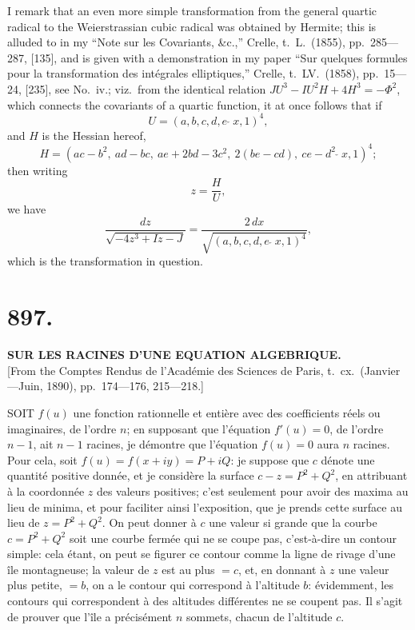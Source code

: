 \documentclass[11pt,a4paper]{book}
\begin{document}
I remark that an even more simple transformation from the general quartic radical to the Weierstrassian cubic radical was obtained by Hermite; this is alluded to in my ``Note sur les Covariants, \&c.,'' Crelle, t.\ L.\ (1855), pp.\ 285---287, [135], and is given with a demonstration in my paper ``Sur quelques formules pour la transformation des int\'egrales elliptiques,'' Crelle, t.\ LV.\ (1858), pp.\ 15---24, [235], see No.\ iv.; viz.\ from the identical relation $JU^3 - IU^2H + 4H^3 = -\Phi^2$, which connects the covariants of a quartic function, it at once follows that if
\[
U = (a, b, c, d, e \,\check{\,}\, x, 1)^4,
\]
and $H$ is the Hessian hereof,
\[
H = (ac-b^2,\ ad-bc,\ ae+2bd-3c^2,\ 2(be-cd),\ ce-d^2 \,\check{\,}\, x, 1)^4;
\]
then writing
\[
z = \frac{H}{U},
\]
we have
\[
\frac{dz}{\sqrt{-4z^3 + Iz - J}} = \frac{2\,dx}{\sqrt{(a, b, c, d, e \,\check{\,}\, x, 1)^4}},
\]
which is the transformation in question.


\section*{897.}
\begin{center}
{\large\bfseries SUR LES RACINES D'UNE EQUATION ALGEBRIQUE.}\\[0.5em]
\small [From the Comptes Rendus de l'Acad\'emie des Sciences de Paris, t.\ cx.\ (Janvier---Juin, 1890), pp.\ 174---176, 215---218.]
\end{center}

SOIT $f(u)$ une fonction rationnelle et enti\`ere avec des coefficients r\'eels ou imaginaires, de l'ordre $n$; en supposant que l'\'equation $f'(u) = 0$, de l'ordre $n - 1$, ait $n - 1$ racines, je d\'emontre que l'\'equation $f(u) = 0$ aura $n$ racines. Pour cela, soit $f(u) = f(x + iy) = P + iQ$: je suppose que $c$ d\'enote une quantit\'e positive donn\'ee, et je consid\`ere la surface $c - z = P^2 + Q^2$, en attribuant \`a la coordonn\'ee $z$ des valeurs positives; c'est seulement pour avoir des maxima au lieu de minima, et pour faciliter ainsi l'exposition, que je prends cette surface au lieu de $z = P^2 + Q^2$. On peut donner \`a $c$ une valeur si grande que la courbe $c = P^2 + Q^2$ soit une courbe ferm\'ee qui ne se coupe pas, c'est-\`a-dire un contour simple: cela \'etant, on peut se figurer ce contour comme la ligne de rivage d'une \^ile montagneuse; la valeur de $z$ est au plus $= c$, et, en donnant \`a $z$ une valeur plus petite, $= b$, on a le contour qui correspond \`a l'altitude $b$: \'evidemment, les contours qui correspondent \`a des altitudes diff\'erentes ne se coupent pas. Il s'agit de prouver que l'\^ile a pr\'ecis\'ement $n$ sommets, chacun de l'altitude $c$.
\end{document}
